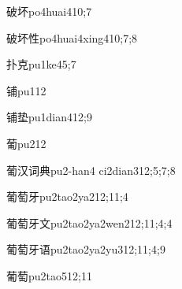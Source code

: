 \begin{verbete}{破坏}{po4huai4}{10;7}
\end{verbete}

\begin{verbete}{破坏性}{po4huai4xing4}{10;7;8}
\end{verbete}

\begin{verbete}{扑克}{pu1ke4}{5;7}
\end{verbete}

\begin{verbete}{铺}{pu1}{12}
\end{verbete}

\begin{verbete}{铺垫}{pu1dian4}{12;9}
\end{verbete}

\begin{verbete}{葡}{pu2}{12}
\end{verbete}

\begin{verbete}{葡汉词典}{pu2-han4 ci2dian3}{12;5;7;8}
\end{verbete}

\begin{verbete}{葡萄牙}{pu2tao2ya2}{12;11;4}
\end{verbete}

\begin{verbete}{葡萄牙文}{pu2tao2ya2wen2}{12;11;4;4}
\end{verbete}

\begin{verbete}{葡萄牙语}{pu2tao2ya2yu3}{12;11;4;9}
\end{verbete}

\begin{verbete}{葡萄}{pu2tao5}{12;11}
\end{verbete}

